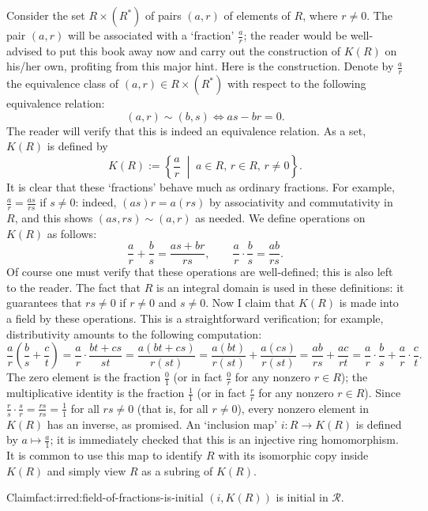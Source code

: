 Consider the set $R \times (R^*)$ of pairs $(a, r)$ of elements of
$R$, where $r \neq 0$. The pair $(a, r)$ will be associated with a
`fraction' $\frac{a}{r}$; the reader would be well-advised to put this
book away now and carry out the construction of $K(R)$ on his/her own,
profiting from this major hint.  Here is the construction. Denote by
$\frac{a}{r}$ the equivalence class of $(a, r) \in R \times (R^*)$
with respect to the following equivalence relation:
\[(a, r) \sim (b, s) \iff as - br = 0.\] The reader will verify that
this is indeed an equivalence relation. As a set, $K(R)$ is defined by
\[K(R) := \left\{ \frac{a}{r} \;\middle|\; a \in R,\, r \in R,\, r
    \neq 0 \right\}.\] It is clear that these `fractions' behave much
as ordinary fractions. For example, $\frac{a}{r} = \frac{as}{rs}$ if
$s \neq 0$: indeed, $(as)r = a(rs)$ by associativity and commutativity
in $R$, and this shows $(as, rs) \sim (a, r)$ as needed.  We define
operations on $K(R)$ as follows:
\[\frac{a}{r} + \frac{b}{s} = \frac{as + br}{rs}, \qquad
  \frac{a}{r} \cdot \frac{b}{s} = \frac{ab}{rs}.\] Of course one must
verify that these operations are well-defined; this is also left to
the reader. The fact that $R$ is an integral domain is used in these
definitions: it guarantees that $rs \neq 0$ if $r \neq 0$ and
$s \neq 0$.  Now I claim that $K(R)$ is made into a field by these
operations. This is a straightforward verification; for example,
distributivity amounts to the following computation:
\[\frac{a}{r}\left(\frac{b}{s} + \frac{c}{t}\right)
  = \frac{a}{r} \cdot \frac{bt + cs}{st} = \frac{a(bt+cs)}{r(st)} =
  \frac{a(bt)}{r(st)} + \frac{a(cs)}{r(st)} = \frac{ab}{rs} +
  \frac{ac}{rt} = \frac{a}{r}\cdot\frac{b}{s} +
  \frac{a}{r}\cdot\frac{c}{t}.\] The zero element is the fraction
$\frac{0}{1}$ (or in fact $\frac{0}{r}$ for any nonzero $r \in R$);
the multiplicative identity is the fraction $\frac{1}{1}$ (or in fact
$\frac{r}{r}$ for any nonzero $r \in R$).  Since
$\frac{r}{s} \cdot \frac{s}{r} = \frac{rs}{rs} = \frac{1}{1}$ for all
$rs \neq 0$ (that is, for all $r \neq 0$), every nonzero element in
$K(R)$ has an inverse, as promised.  An `inclusion map'
$i : R \to K(R)$ is defined by $a \mapsto \frac{a}{1}$; it is
immediately checked that this is an injective ring homomorphism.  It
is common to use this map to identify $R$ with its isomorphic copy
inside $K(R)$ and simply view $R$ as a subring of $K(R)$.
\begin{fact}{Claim}{fact:irred:field-of-fractions-is-initial}
  $(i, K(R))$ is initial in $\mathscr{R}$.
\end{fact}

